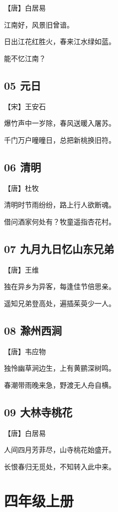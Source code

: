 \documentclass[a6paper, 12pt]{article}
\begin{document}
【唐】白居易

江南好，风景旧曾谙。

日出江花红胜火，春来江水绿如蓝。

能不忆江南？

\subsection*{05 元日}

【宋】王安石

爆竹声中一岁除，春风送暖入屠苏。

千门万户曈曈日，总把新桃换旧符。

\subsection*{06 清明}

【唐】杜牧

清明时节雨纷纷，路上行人欲断魂。

借问酒家何处有？牧童遥指杏花村。

\subsection*{07 九月九日忆山东兄弟}

【唐】王维

独在异乡为异客，每逢佳节倍思亲。

遥知兄弟登高处，遍插茱萸少一人。

\subsection*{08 滁州西涧}

【唐】韦应物

独怜幽草涧边生，上有黄鹂深树鸣。

春潮带雨晚来急，野渡无人舟自横。

\subsection*{09 大林寺桃花}

【唐】白居易

人间四月芳菲尽，山寺桃花始盛开。

长恨春归无觅处，不知转入此中来。

\newpage

\section*{四年级上册}
\end{document}
